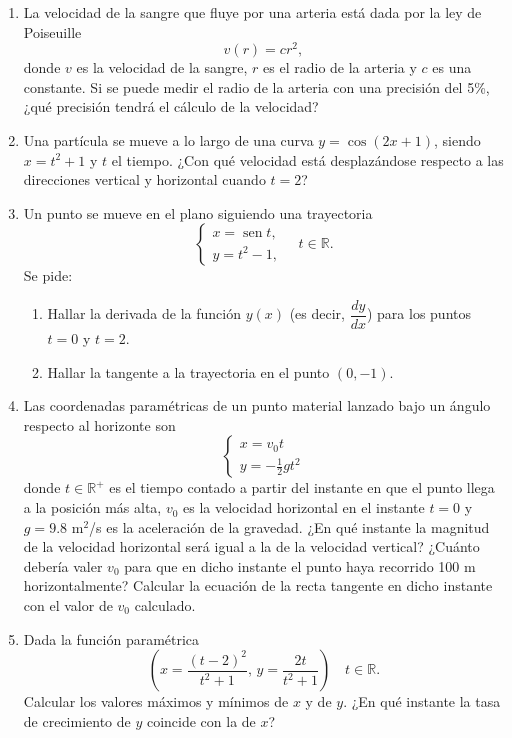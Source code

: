 \documentclass[a4paper,titlepage]{article}
\DeclareMathOperator{\sen}{sen}
\theoremstyle{solution}
\begin{document}
\begin{enumerate}[leftmargin=*]
\item La velocidad de la sangre que fluye por una arteria está dada por la ley de Poiseuille
\[
v(r) = cr^2,
\]
donde $v$ es la velocidad de la sangre, $r$ es el radio de la arteria y $c$ es una constante. 
Si se puede medir el radio de la arteria con una precisión del 5\%, ¿qué precisión tendrá el cálculo de la velocidad?

\item Una partícula se mueve a lo largo de una curva $y=\cos(2x+1)$, siendo $x=t^2+1$ y $t$ el tiempo. 
¿Con qué velocidad está desplazándose respecto a las direcciones vertical y horizontal cuando $t=2$?

\item Un punto se mueve en el plano siguiendo una trayectoria
\[ 
\begin{cases}
x= \sen t,\\
y = t^2-1,
\end{cases}
\quad t\in \mathbb{R}.
\]
Se pide:
\begin{enumerate}
\item  Hallar la derivada de la función $y(x)$ (es decir, $\dfrac{dy}{dx}$) para los puntos $t=0$ y $t=2$.
\item  Hallar la tangente a la trayectoria en el punto $(0,-1)$.
\end{enumerate}

\item Las coordenadas paramétricas de un punto material lanzado bajo un ángulo respecto al horizonte son
\[
\begin{cases}
x=v_0t \\
y=-\frac{1}{2}gt^2
\end{cases}
\]
donde $t\in \mathbb{R}^{+}$ es el tiempo contado a partir del instante en que el punto llega a la posición más alta, $v_0$ es la velocidad horizontal en el instante $t=0$ y $g=9.8$ m$^2$/s es la aceleración de la gravedad. 
¿En qué instante la magnitud de la velocidad horizontal será igual a la de la velocidad vertical? ¿Cuánto debería valer $v_0$ para que en dicho instante el punto haya recorrido 100 m horizontalmente? 
Calcular la ecuación de la recta tangente en dicho instante con el valor de $v_0$ calculado.

\item Dada la función paramétrica
\[
\left(
x =\frac{(t-2)^2}{t^2+1},\, y=\frac{2t}{t^2+1}
\right)\quad t\in \mathbb{R}.
\]
Calcular los valores máximos y mínimos de $x$ y de $y$. 
¿En qué instante la tasa de crecimiento de $y$ coincide con la de $x$?


\end{enumerate}
\end{document}
